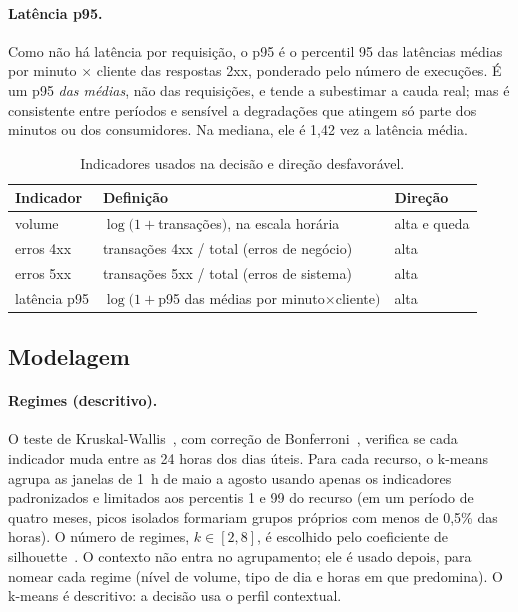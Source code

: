 \documentclass[sigconf,nonacm]{acmart}
\begin{document}
\paragraph{Latência p95.} Como não há latência por requisição, o p95 é o percentil 95 das latências médias por minuto $\times$ cliente das respostas 2xx, ponderado pelo número de execuções. É um p95 \emph{das médias}, não das requisições, e tende a subestimar a cauda real; mas é consistente entre períodos e sensível a degradações que atingem só parte dos minutos ou dos consumidores. Na mediana, ele é 1,42 vez a latência média.

\begin{table}[t]
  \caption{Indicadores usados na decisão e direção desfavorável.}
  \label{tab:atributos}
  \small
  \begin{tabular}{p{}p{}p{}}
    \toprule
    Indicador & Definição & Direção \\
    \midrule
    volume & $\log(1+$transações$)$, na escala horária & alta e queda \\
    erros 4xx & transações 4xx / total (erros de negócio) & alta \\
    erros 5xx & transações 5xx / total (erros de sistema) & alta \\
    latência p95 & $\log(1+$p95 das médias por minuto$\times$cliente$)$ & alta \\
    \bottomrule
  \end{tabular}
\end{table}

\subsection{Modelagem}

\paragraph{Regimes (descritivo).} O teste de Kruskal-Wallis~\citep{kruskal1952ranks}, com correção de Bonferroni~\citep{dunn1961multiple}, verifica se cada indicador muda entre as 24 horas dos dias úteis. Para cada recurso, o k-means~\citep{lloyd1982kmeans} agrupa as janelas de 1~h de maio a agosto usando apenas os indicadores padronizados e limitados aos percentis 1 e 99 do recurso (em um período de quatro meses, picos isolados formariam grupos próprios com menos de 0,5\% das horas). O número de regimes, $k\in[2,8]$, é escolhido pelo coeficiente de silhouette~\citep{rousseeuw1987silhouette}. O contexto não entra no agrupamento; ele é usado depois, para nomear cada regime (nível de volume, tipo de dia e horas em que predomina). O k-means é descritivo: a decisão usa o perfil contextual.
\end{document}
